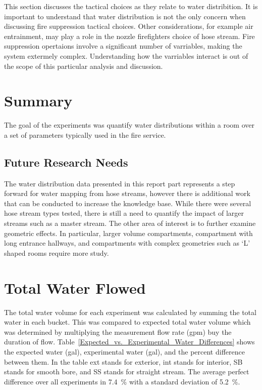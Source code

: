 \documentclass[12pt,oneside]{book}
\begin{document}
This section discusses the tactical choices as they relate to water distribition. It is important to understand that water distribution is not the only concern when discussing fire suppression tactical choices. Other considerations, for example air entrainment, may play a role in the nozzle firefighters choice of hose stream. Fire suppression opertaions involve a significant number of varriables, making the system extermely complex. Understanding how the varriables interact is out of the scope of this particular analysis and discussion. 

\chapter{Summary}
The goal of the experiments was quantify water distributions within a room over a set of parameters typically used in the fire service. 

\section{Future Research Needs}
The water distribution data presented in this report part represents a step forward for water mapping from hose streams, however there is additional work that can be conducted to increase the knowledge base. While there were several hose stream types tested, there is still a need to quantify the impact of larger streams such as a master stream. The other area of interest is to further examine geometric effects. In particular, larger volume compartments, compartment with long entrance hallways, and compartments with complex geometries such as `L' shaped rooms require more study.

 



\appendix

\chapter{Total Water Flowed}
\label{app:Water_Volume}

The total water volume for each experiment was calculated by summing the total water in each bucket. This was compared to expected total water volume which was determined by multiplying the measurement flow rate (gpm) buy the duration of flow. Table~\ref{Expected_vs._Experimental_Water_Differences} shows the expected water (gal), experimental water (gal), and the percent difference between them. In the table ext stands for exterior, int stands for interior, SB stands for smooth bore, and SS stands for straight stream. The average perfect difference over all experiments in 7.4~\% with a standard deviation of 5.2~\%.
\end{document}
